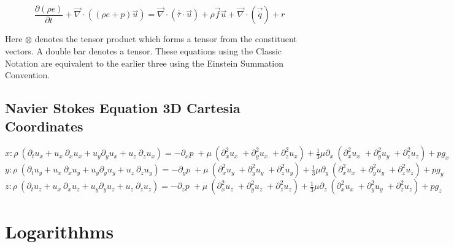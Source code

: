 \documentclass[]{article}
\begin{document}
\begin{equation}
	\frac{\partial(\rho e)}{\partial t} + \overrightarrow{\nabla}\cdot((\rho e + p)\overrightarrow{u}) = \overrightarrow{\nabla}\cdot(\overline{\overline{\tau}}\cdot\overrightarrow{u}) + \rho\overrightarrow{f}\overrightarrow{u} + \overrightarrow{\nabla}\cdot(\overrightarrow{\dot{q}})+r
\end{equation}

Here $\otimes$ denotes the tensor product which forms a tensor from the constituent vectors.  A double bar denotes a tensor.  These equations using the Classic Notation are equivalent to the earlier three using the Einstein Summation Convention.

\subsection{Navier Stokes Equation 3D Cartesia Coordinates}

\begin{center}
	\bigskip\LARGE{$x: \rho \: (\partial_t u_x + u_x \: \partial_x u_x + u_y \partial_y u_x + u_z \: \partial_z u_x) = -\partial_x p \; + \mu \: (\partial_x^2 u_x \; + \partial_y^2 u_x \; + \partial_z^2 u_x) + \frac{1}{3} \mu \partial_x \: (\partial_x^2 u_x \; + \partial_y^2 u_y \; + \partial_z^2 u_z) + pg_x$}\\
	\bigskip\LARGE{$y: \rho \: (\partial_t u_y + u_x \: \partial_x u_y + u_y \partial_y u_y + u_z \: \partial_z u_y) = -\partial_y p \; + \mu \: (\partial_x^2 u_y \; + \partial_y^2 u_y \; + \partial_z^2 u_y) + \frac{1}{3} \mu \partial_y \: (\partial_x^2 u_x \; + \partial_y^2 u_y \; + \partial_z^2 u_z) + pg_y$}\\
	\bigskip\LARGE{$z: \rho \: (\partial_t u_z + u_x \: \partial_x u_z + u_y \partial_y u_z + u_z \: \partial_z u_z) = -\partial_z p \; + \mu \: (\partial_x^2 u_z \; + \partial_y^2 u_z \; + \partial_z^2 u_z) + \frac{1}{3} \mu \partial_z \: (\partial_x^2 u_x \; + \partial_y^2 u_y \; + \partial_z^2 u_z) + pg_z$\\}
	
\end{center}
\newpage

\section{Logarithhms}
\end{document}
